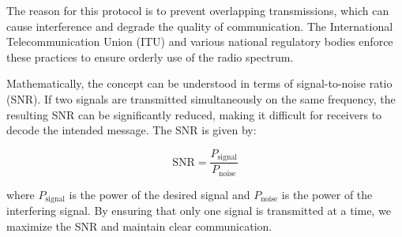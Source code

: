 The reason for this protocol is to prevent overlapping transmissions, which can cause interference and degrade the quality of communication. The International Telecommunication Union (ITU) and various national regulatory bodies enforce these practices to ensure orderly use of the radio spectrum.

Mathematically, the concept can be understood in terms of signal-to-noise ratio (SNR). If two signals are transmitted simultaneously on the same frequency, the resulting SNR can be significantly reduced, making it difficult for receivers to decode the intended message. The SNR is given by:

\[
\text{SNR} = \frac{P_{\text{signal}}}{P_{\text{noise}}}
\]

where \(P_{\text{signal}}\) is the power of the desired signal and \(P_{\text{noise}}\) is the power of the interfering signal. By ensuring that only one signal is transmitted at a time, we maximize the SNR and maintain clear communication.

